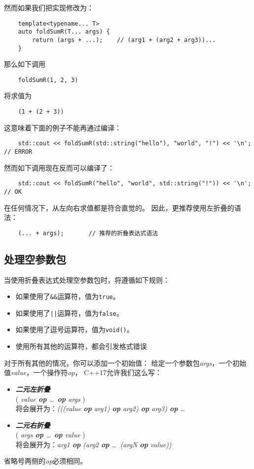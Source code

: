 然而如果我们把实现修改为：
\begin{lstlisting}
    template<typename... T>
    auto foldSumR(T... args) {
        return (args + ...);    // (arg1 + (arg2 + arg3))...
    }
\end{lstlisting}
那么如下调用
\begin{lstlisting}
    foldSumR(1, 2, 3)
\end{lstlisting}
将求值为
\begin{lstlisting}
    (1 + (2 + 3))
\end{lstlisting}
这意味着下面的例子不能再通过编译：
\begin{lstlisting}
    std::cout << foldSumR(std::string("hello"), "world", "!") << '\n';  // ERROR
\end{lstlisting}
然而如下调用现在反而可以编译了：
\begin{lstlisting}
    std::cout << foldSumR("hello", "world", std::string("!")) << '\n';  // OK
\end{lstlisting}
在任何情况下，从左向右求值都是符合直觉的。
因此，更推荐使用左折叠的语法：
\begin{lstlisting}
    (... + args);       // 推荐的折叠表达式语法
\end{lstlisting}

\subsection{处理空参数包}\label{ch11.2.1}
当使用折叠表达式处理空参数包时，将遵循如下规则：
\begin{itemize}
    \item 如果使用了\texttt{\&\&}运算符，值为\texttt{true}。
    \item 如果使用了\texttt{||}运算符，值为\texttt{false}。
    \item 如果使用了逗号运算符，值为\texttt{void()}。
    \item 使用所有其他的运算符，都会引发格式错误
\end{itemize}
对于所有其他的情况，你可以添加一个初始值：
给定一个参数包\emph{args}，一个初始值\emph{value}，一个操作符\emph{op}，
C++17允许我们这么写：
\begin{itemize}
    \item \emph{\textbf{二元左折叠}}\\
    \hspace*{2em}( \emph{value \textbf{op} \ldots \, \textbf{op} args} )\\
    将会展开为：\emph{(((value \textbf{op} arg1) \textbf{op} arg2) \textbf{op} arg3) \textbf{op} \ldots}
    \item \emph{\textbf{二元右折叠}}\\
    \hspace*{2em}( \emph{args \textbf{op} \ldots \, \textbf{op} value} )\\
    将会展开为：\emph{arg1 \textbf{op} (arg2 \textbf{op} \ldots \, (argN \textbf{op} value))}
\end{itemize}
省略号两侧的\emph{op}必须相同。

